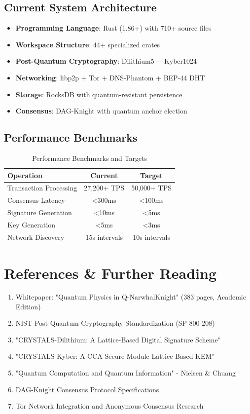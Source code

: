 \documentclass[11pt,a4paper]{article}
\begin{document}
\subsection{Current System Architecture}

\begin{itemize}
\item \textbf{Programming Language}: Rust (1.86+) with 710+ source files
\item \textbf{Workspace Structure}: 44+ specialized crates
\item \textbf{Post-Quantum Cryptography}: Dilithium5 + Kyber1024
\item \textbf{Networking}: libp2p + Tor + DNS-Phantom + BEP-44 DHT
\item \textbf{Storage}: RocksDB with quantum-resistant persistence
\item \textbf{Consensus}: DAG-Knight with quantum anchor election
\end{itemize}

\subsection{Performance Benchmarks}

\begin{table}[h!]
\centering
\begin{tabular}{@{}lcc@{}}
\toprule
\textbf{Operation} & \textbf{Current} & \textbf{Target} \\
\midrule
Transaction Processing & 27,200+ TPS & 50,000+ TPS \\
Consensus Latency & <300ms & <100ms \\
Signature Generation & <10ms & <5ms \\
Key Generation & <5ms & <3ms \\
Network Discovery & 15s intervals & 10s intervals \\
\bottomrule
\end{tabular}
\caption{Performance Benchmarks and Targets}
\end{table}

\section{References \& Further Reading}

\begin{enumerate}
\item Whitepaper: "Quantum Physics in Q-NarwhalKnight" (383 pages, Academic Edition)
\item NIST Post-Quantum Cryptography Standardization (SP 800-208)
\item "CRYSTALS-Dilithium: A Lattice-Based Digital Signature Scheme" 
\item "CRYSTALS-Kyber: A CCA-Secure Module-Lattice-Based KEM"
\item "Quantum Computation and Quantum Information" - Nielsen \& Chuang
\item DAG-Knight Consensus Protocol Specifications
\item Tor Network Integration and Anonymous Consensus Research
\end{enumerate}
\end{document}
